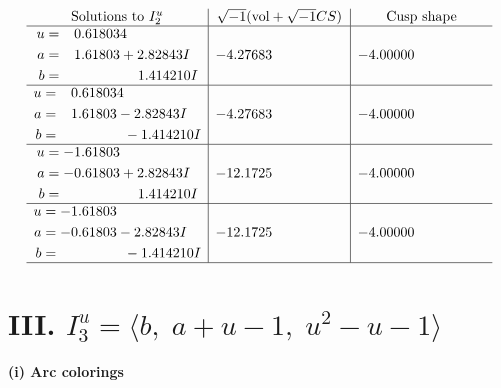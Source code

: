 \documentclass[1p]{elsarticle_modified}
\theoremstyle{definition}
\newcommand{\I}{\sqrt{-1}}
\begin{document}
$$\begin{array}{c|c|c}  
\text{Solutions to }I^u_{2}& \I (\text{vol} + \sqrt{-1}CS) & \text{Cusp shape}\\
 \hline 
\begin{aligned}
u &= \phantom{-}0.618034\phantom{ +0.000000I} \\
a &= \phantom{-}1.61803 + 2.82843 I \\
b &= \phantom{-0.000000 -}1.414210 I\end{aligned}
 & -4.27683\phantom{ +0.000000I} & -4.00000\phantom{ +0.000000I} \\ \hline\begin{aligned}
u &= \phantom{-}0.618034\phantom{ +0.000000I} \\
a &= \phantom{-}1.61803 - 2.82843 I \\
b &= \phantom{-0.000000 } -1.414210 I\end{aligned}
 & -4.27683\phantom{ +0.000000I} & -4.00000\phantom{ +0.000000I} \\ \hline\begin{aligned}
u &= -1.61803\phantom{ +0.000000I} \\
a &= -0.61803 + 2.82843 I \\
b &= \phantom{-0.000000 -}1.414210 I\end{aligned}
 & -12.1725\phantom{ +0.000000I} & -4.00000\phantom{ +0.000000I} \\ \hline\begin{aligned}
u &= -1.61803\phantom{ +0.000000I} \\
a &= -0.61803 - 2.82843 I \\
b &= \phantom{-0.000000 } -1.414210 I\end{aligned}
 & -12.1725\phantom{ +0.000000I} & -4.00000\phantom{ +0.000000I}\\
 \hline 
 \end{array}$$\newpage\newpage\renewcommand{\arraystretch}{1}
\centering \section*{III. $I^u_{3}= \langle b,\;a+u-1,\;u^2- u-1 \rangle$}
\flushleft \textbf{(i) Arc colorings}\\
\end{document}
